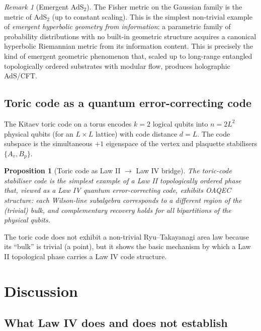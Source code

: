 \documentclass[12pt]{article}
\newtheorem{proposition}[theorem]{Proposition}
\theoremstyle{definition}
\theoremstyle{remark}
\newtheorem{remark}[theorem]{Remark}
\begin{document}
\begin{remark}[Emergent AdS$_2$]
The Fisher metric on the Gaussian family is the metric of AdS$_2$ (up to constant scaling). This is the simplest non-trivial example of \emph{emergent hyperbolic geometry from information}: a parametric family of probability distributions with no built-in geometric structure acquires a canonical hyperbolic Riemannian metric from its information content. This is precisely the kind of emergent geometric phenomenon that, scaled up to long-range entangled topologically ordered substrates with modular flow, produces holographic AdS/CFT.
\end{remark}

\subsection{Toric code as a quantum error-correcting code}

The Kitaev toric code on a torus encodes $k=2$ logical qubits into $n = 2L^2$ physical qubits (for an $L\times L$ lattice) with code distance $d = L$. The code subspace is the simultaneous $+1$ eigenspace of the vertex and plaquette stabilisers $\{A_v, B_p\}$.

\begin{proposition}[Toric code as Law II $\to$ Law IV bridge]
\label{prop:toric-bridge}
The toric-code stabiliser code is the simplest example of a Law II topologically ordered phase that, viewed as a Law IV quantum error-correcting code, exhibits OAQEC structure: each Wilson-line subalgebra corresponds to a different region of the (trivial) bulk, and complementary recovery holds for all bipartitions of the physical qubits.
\end{proposition}

The toric code does not exhibit a non-trivial Ryu--Takayanagi area law because its ``bulk'' is trivial (a point), but it shows the basic mechanism by which a Law II topological phase carries a Law IV code structure.

\section{Discussion}
\label{sec:discussion}

\subsection{What Law IV does and does not establish}
\end{document}
